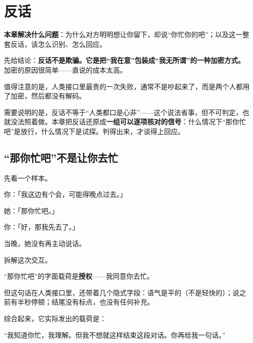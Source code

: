 \chapter{反话}


\begin{guideblock}
\textbf{本章解决什么问题}：为什么对方明明想让你留下，却说“你忙你的吧”；以及这一整套反话，该怎么识别、怎么回应。
\end{guideblock}

先给结论：\textbf{反话不是欺骗。它是把“我在意”包装成“我无所谓”的一种加密方式。}加密的原因很简单——直说的成本太高。

值得注意的是，人类接口里最贵的一次失败，通常不是吵起来了，而是两个人都用了加密，然后都没有解码。

需要说明的是，反话不等于“人类都口是心非”——这个说法省事，但不可判定，也就没法照着做。本章把反话还原成\textbf{一组可以逐项核对的信号}：什么情况下“那你忙吧”是放行，什么情况下是试探。判得出来，才谈得上回应。

\hcirule

\section{“那你忙吧”不是让你去忙}

先看一个样本。

\par
\begin{mdquote}
你：「我这边有个会，可能得晚点过去。」\par
她：「那你忙吧。」\par
你：「好，那我先去了。」\par
\vspace{0.3\baselineskip}
当晚，她没有再主动说话。
\end{mdquote}

拆解这次交互。

“那你忙吧”的字面载荷是\textbf{授权}——我同意你去忙。

但这句话在人类接口里，还带着几个隐式字段：语气是平的（不是轻快的）；说之前有半秒停顿；结尾没有标点，也没有任何补充。

综合起来，它实际发出的载荷是：

\begin{mdquote}
“我知道你忙，我理解。但我不想就这样结束这段对话。你再给我一句话。”
\end{mdquote}

